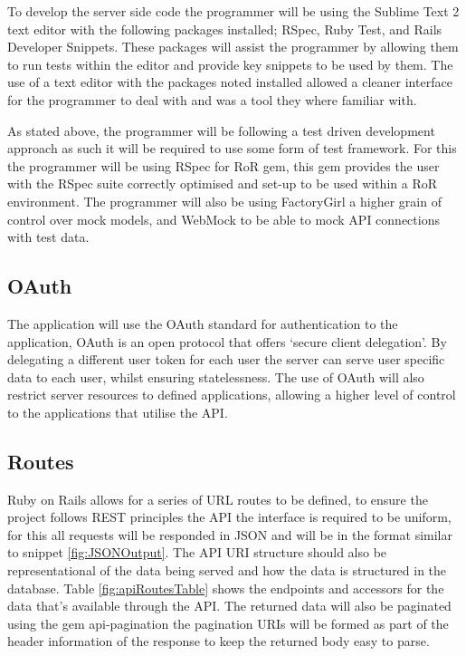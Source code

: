 			To develop the server side code the programmer will be using the Sublime Text 2 text editor\cite{sublime} with the following packages installed; RSpec\cite{RSpecSub}, Ruby Test\cite{RubyTest}, and Rails Developer Snippets\cite{RDS}. These packages will assist the programmer by allowing them to run tests within the editor and provide key snippets to be used by them. The use of a text editor with the packages noted installed allowed a cleaner interface for the programmer to deal with and was a tool they where familiar with. 

			As stated above, the programmer will be following a test driven development approach as such it will be required to use some form of test framework. For this the programmer will be using RSpec for RoR gem\cite{RSpecRails}, this gem provides the user with the RSpec suite correctly optimised and set-up to be used within a RoR environment. The programmer will also be using FactoryGirl\cite{FactoryGirl} a higher grain of control over mock models, and WebMock\cite{WebMock} to be able to mock API connections with test data. 

		\subsection{OAuth}
			The application will use the OAuth standard for authentication to the application, OAuth is an open protocol that offers `secure client delegation'. By delegating a different user token for each user the server can serve user specific data to each user, whilst ensuring statelessness. The use of OAuth will also restrict server resources to defined applications, allowing a higher level of control to the applications that utilise the API. 

		\subsection{Routes}
			Ruby on Rails allows for a series of URL routes to be defined, to ensure the project follows REST principles the API the interface is required to be uniform, for this all requests will be responded in JSON and will be in the format similar to snippet \ref{fig:JSONOutput}. The API URI structure should also be representational of the data being served and how the data is structured in the database. Table \ref{fig:apiRoutesTable} shows the endpoints and accessors for the data that's available through the API. The returned data will also be paginated using the gem api-pagination\cite{paginate} the pagination URIs will be formed as part of the header information of the response to keep the returned body easy to parse. 

